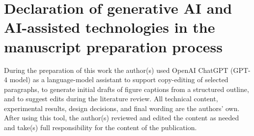 \documentclass[11pt,a4paper]{article}
\begin{document}
\section*{Declaration of generative AI and AI-assisted technologies
in the manuscript preparation process}
During the preparation of this work the author(s) used OpenAI ChatGPT
(GPT-4 model) as a language-model assistant to support copy-editing of
selected paragraphs, to generate initial drafts of figure captions from a
structured outline, and to suggest edits during the literature review. All
technical content, experimental results, design decisions, and final wording
are the authors' own. After using this tool, the author(s) reviewed and edited
the content as needed and take(s) full responsibility for the content of the
publication.
\end{document}
